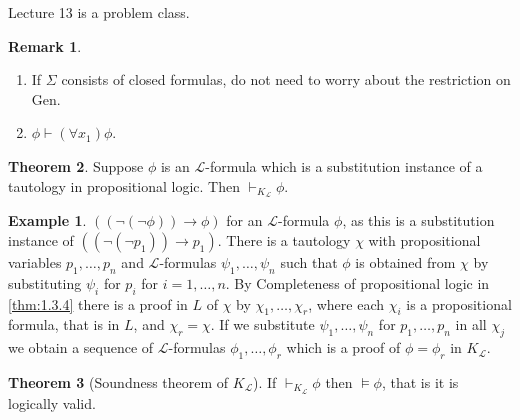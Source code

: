 \documentclass{article}
\renewcommand{\L}{\mathcal{L}}
\newcommand{\rb}[1]{\left( #1 \right)}
\newcommand{\notb}[1]{\rb{\neg #1}}
\newcommand{\impb}[2]{\rb{#1 \rightarrow #2}}
\newcommand{\fab}[1]{\rb{\forall #1}}
\theoremstyle{definition}\newtheorem{definition}{Definition}[subsection]
\theoremstyle{definition}\newtheorem{remark}[definition]{Remark}
\theoremstyle{definition}\newtheorem*{example}{Example}
\theoremstyle{definition}\newtheorem*{note}{Note}
\newtheorem{theorem}[definition]{Theorem}
\begin{document}

Lecture 13 is a problem class.


\begin{remark}
\hfill
\begin{enumerate}
\item If $ \Sigma $ consists of closed formulas, do not need to worry about the restriction on Gen.
\item $ \phi \vdash \fab{x_1}\phi $.
\end{enumerate}
\end{remark}

\begin{theorem}
\label{thm:2.4.4}
Suppose $ \phi $ is an $ \L $-formula which is a substitution instance of a tautology in propositional logic. Then $ \vdash_{K_{\L}} \phi $.
\end{theorem}

\begin{example}
$ \impb{\notb{\notb{\phi}}}{\phi} $ for an $ \L $-formula $ \phi $, as this is a substitution instance of $ \impb{\notb{\notb{p_1}}}{p_1} $. There is a tautology $ \chi $ with propositional variables $ p_1, \dots, p_n $ and $ \L $-formulas $ \psi_1, \dots, \psi_n $ such that $ \phi $ is obtained from $ \chi $ by substituting $ \psi_i $ for $ p_i $ for $ i = 1, \dots, n $. By Completeness of propositional logic in \ref{thm:1.3.4} there is a proof in $ L $ of $ \chi $ by $ \chi_1, \dots, \chi_r $, where each $ \chi_i $ is a propositional formula, that is in $ L $, and $ \chi_r = \chi $. If we substitute $ \psi_1, \dots, \psi_n $ for $ p_1, \dots, p_n $ in all $ \chi_j $ we obtain a sequence of $ \L $-formulas $ \phi_1, \dots, \phi_r $ which is a proof of $ \phi = \phi_r $ in $ K_{\L} $.
\end{example}

\begin{theorem}[Soundness theorem of $ K_{\L} $]
\label{thm:2.4.5}
If $ \vdash_{K_{\L}} \phi $ then $ \vDash \phi $, that is it is logically valid.
\end{theorem}
\end{document}
